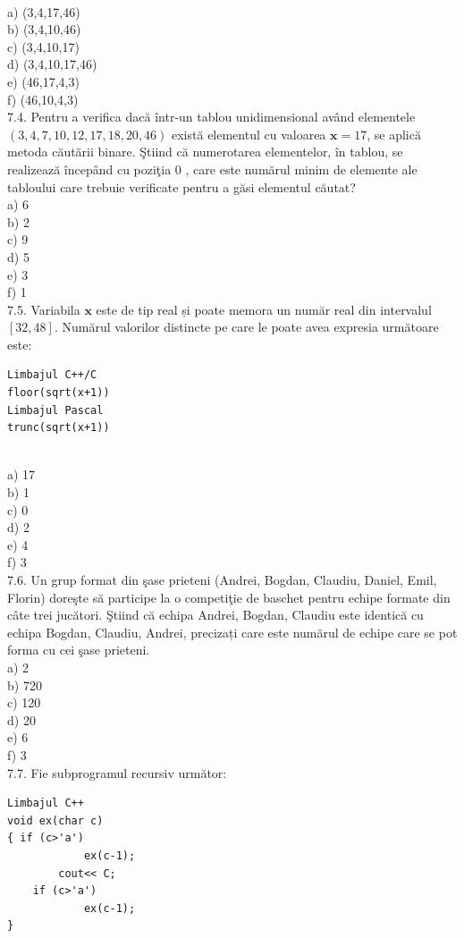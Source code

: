 \\
a) (3,4,17,46)
\\
b) (3,4,10,46)
\\
c) (3,4,10,17)
\\
d) (3,4,10,17,46)
\\
e) (46,17,4,3)
\\
f) (46,10,4,3)
\\
7.4. Pentru a verifica dacă într-un tablou unidimensional având elementele $(3,4,7,10,12,17,18,20,46)$ există elementul cu valoarea $\mathbf{x}=17$, se aplică metoda căutării binare. Ştiind că numerotarea elementelor, în tablou, se realizează începând cu poziţia 0 , care este numărul minim de elemente ale tabloului care trebuie verificate pentru a găsi elementul căutat?
\\
a) 6
\\
b) 2
\\
c) 9
\\
d) 5
\\
e) 3
\\
f) 1
\\
7.5. Variabila $\mathbf{x}$ este de tip real și poate memora un număr real din intervalul $[32,48]$. Numărul valorilor distincte pe care le poate avea expresia următoare este:
\begin{verbatim}
Limbajul C++/C
floor(sqrt(x+1))
Limbajul Pascal
trunc(sqrt(x+1))
\end{verbatim}
\\
a) 17
\\
b) 1
\\
c) 0
\\
d) 2
\\
e) 4
\\
f) 3
\\
7.6. Un grup format din şase prieteni (Andrei, Bogdan, Claudiu, Daniel, Emil, Florin) doreşte să participe la o competiţie de baschet pentru echipe formate din câte trei jucători. Ştiind că echipa Andrei, Bogdan, Claudiu este identică cu echipa Bogdan, Claudiu, Andrei, precizați care este numărul de echipe care se pot forma cu cei şase prieteni.
\\
a) 2
\\
b) 720
\\
c) 120
\\
d) 20
\\
e) 6
\\
f) 3
\\
7.7. Fie subprogramul recursiv următor:
\begin{verbatim}
Limbajul C++
void ex(char c)
{ if (c>'a')
            ex(c-1);
        cout<< C;
    if (c>'a')
            ex(c-1);
}
\end{verbatim}
